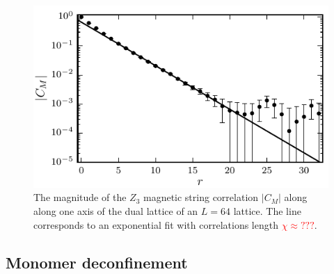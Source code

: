 \documentclass[twocolumn,prb,aps,floatfix,superscriptaddress]{revtex4-1}
\newcommand{\note}[1]{\textcolor{red}{#1}}
\begin{document}
\begin{figure}
    \centering
    \includegraphics[width=1.0\columnwidth]{spatial_cors_z3_vis.pdf}
    \caption{ The magnitude of the $Z_3$ magnetic string correlation $|C_M|$ along along one axis of the dual lattice of an $L=64$ lattice. The line corresponds to an exponential fit with correlations length \note{$\chi\approx???$}.}
    \label{fig:vison_cor}
\end{figure}


\subsection{Monomer deconfinement}
\end{document}
